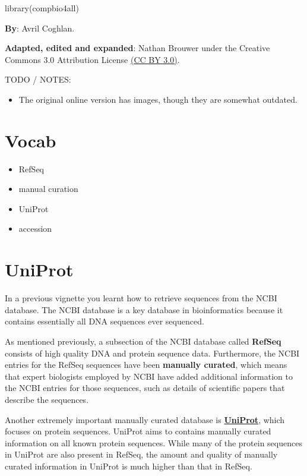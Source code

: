 \documentclass[
]{book}
\newenvironment{Shaded}{\begin{snugshade}}{\end{snugshade}}
\newcommand{\FunctionTok}[1]{\textcolor[rgb]{0.00,0.00,0.00}{#1}}
\newcommand{\NormalTok}[1]{#1}
\providecommand{\tightlist}{%
  \setlength{\itemsep}{0pt}\setlength{\parskip}{0pt}}
\begin{document}
\begin{Shaded}
\begin{Highlighting}[]
\FunctionTok{library}\NormalTok{(compbio4all)}
\end{Highlighting}
\end{Shaded}

\textbf{By}: Avril Coghlan.

\textbf{Adapted, edited and expanded}: Nathan Brouwer under the Creative Commons 3.0 Attribution License \href{https://creativecommons.org/licenses/by/3.0/}{(CC BY 3.0)}.

TODO / NOTES:

\begin{itemize}
\tightlist
\item
  The original online version has images, though they are somewhat outdated.
\end{itemize}

\hypertarget{vocab-1}{%
\section{Vocab}\label{vocab-1}}

\begin{itemize}
\tightlist
\item
  RefSeq
\item
  manual curation
\item
  UniProt
\item
  accession
\end{itemize}

\hypertarget{uniprot}{%
\section{UniProt}\label{uniprot}}

In a previous vignette you learnt how to retrieve sequences from the NCBI database. The NCBI database is a key database in bioinformatics because it contains essentially all DNA sequences ever sequenced.

As mentioned previously, a subsection of the NCBI database called \textbf{RefSeq} consists of high quality DNA and protein sequence data. Furthermore, the NCBI entries for the RefSeq sequences have been \textbf{manually curated}, which means that expert biologists employed by NCBI have added additional information to the NCBI entries for those sequences, such as details of scientific papers that describe the sequences.

Another extremely important manually curated database is \href{www.uniprot.org}{\textbf{UniProt}}, which focuses on protein sequences. UniProt aims to contains manually curated information on all known protein sequences. While many of the protein sequences in UniProt are also present in RefSeq, the amount and quality of manually curated information in UniProt is much higher than that in RefSeq.
\end{document}
